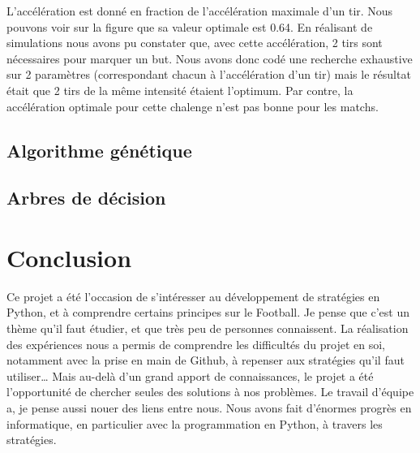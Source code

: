 \documentclass[a4paper,12pt]{article}
\numberwithin{equation}{section}
\begin{document}
L'accélération est donné en fraction de l'accélération maximale d'un tir. Nous pouvons voir sur la figure que sa valeur optimale est 0.64. En réalisant de simulations nous avons pu constater que, avec cette accélération, 2 tirs sont nécessaires pour marquer un but. Nous avons donc codé une recherche exhaustive sur 2 paramètres (correspondant chacun à l’accélération d'un tir) mais le résultat était que 2 tirs de la même intensité étaient l'optimum. Par contre, la accélération optimale pour cette chalenge n'est pas bonne pour les matchs.


\subsection{Algorithme génétique}

\subsection{Arbres de décision}



\section{Conclusion}

Ce projet a été l’occasion de s’intéresser au développement de stratégies en Python, et à comprendre certains principes sur le Football. Je pense que c’est un thème qu’il faut étudier, et que très peu de personnes connaissent. La réalisation des expériences nous a permis de comprendre les difficultés du projet en soi, notamment avec la prise en main de Github, à repenser aux stratégies qu’il faut utiliser… Mais au-delà d’un grand apport de connaissances, le projet a été l’opportunité de chercher seules des solutions à nos problèmes. Le travail d’équipe a, je pense aussi nouer des liens entre nous. Nous avons fait d’énormes progrès en informatique, en particulier avec la programmation en Python, à travers les stratégies.
\end{document}
